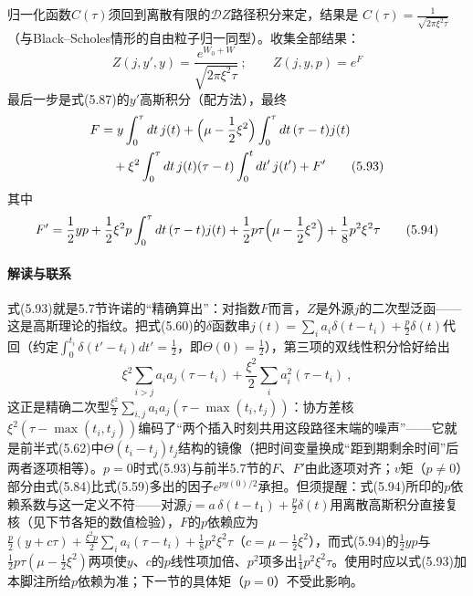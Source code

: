 归一化函数$C(\tau)$须回到离散有限的$\mathcal{D}Z$路径积分来定，结果是
$C(\tau)=\frac{1}{\sqrt{2\pi\xi^{2}\tau}}$（与Black--Scholes情形的自由粒子归一同型）。收集全部结果：
\begin{equation*}
Z(j,y',y)=\frac{e^{W_{0}+W}}{\sqrt{2\pi\xi^{2}\tau}}\ ;\qquad
Z(j,y,p)=e^{F}
\end{equation*}
最后一步是式(5.87)的$y'$高斯积分（配方法），最终
\begin{align*}
F&=y\int_{0}^{\tau}dt\,j(t)
+\Bigl(\mu-\frac{1}{2}\xi^{2}\Bigr)\int_{0}^{\tau}dt\,(\tau-t)j(t)\\
&\quad+\xi^{2}\int_{0}^{\tau}dt\,j(t)(\tau-t)\int_{0}^{t}dt'\,j(t')+F'
\tag{5.93}
\end{align*}
其中
\begin{equation*}
F'=\frac{1}{2}yp+\frac{1}{2}\xi^{2}p\int_{0}^{\tau}dt\,(\tau-t)j(t)
+\frac{1}{2}p\tau\Bigl(\mu-\frac{1}{2}\xi^{2}\Bigr)
+\frac{1}{8}p^{2}\xi^{2}\tau
\tag{5.94}
\end{equation*}

\paragraph{解读与联系}
式(5.93)就是5.7节许诺的“精确算出”：对指数$F$而言，$Z$是外源$j$的二次型泛函——这是高斯理论的指纹。把式(5.60)的$\delta$函数串$j(t)=\sum_ia_i\delta(t-t_i)+\frac{p}{2}\delta(t)$代回（约定$\int_0^{t_i}\delta(t'-t_i)dt'=\frac{1}{2}$，即$\Theta(0)=\frac{1}{2}$），第三项的双线性积分恰好给出
\begin{equation*}
\xi^{2}\sum_{i>j}a_ia_j(\tau-t_i)+\frac{\xi^{2}}{2}\sum_ia_i^{2}(\tau-t_i)\ ,
\end{equation*}
这正是精确二次型$\frac{\xi^{2}}{2}\sum_{i,j}a_ia_j(\tau-\max(t_i,t_j))$：协方差核$\xi^{2}(\tau-\max(t_i,t_j))$编码了“两个插入时刻共用这段路径末端的噪声”——它就是前半式(5.62)中$\Theta(t_i-t_j)t_j$结构的镜像（把时间变量换成“距到期剩余时间”后两者逐项相等）。$p=0$时式(5.93)与前半5.7节的$F$、$F'$由此逐项对齐；$v$矩（$p\neq0$）部分由式(5.84)比式(5.59)多出的因子$e^{py(0)/2}$承担。但须提醒：式(5.94)所印的$p$依赖系数与这一定义不符——对源$j=a\,\delta(t-t_1)+\frac{p}{2}\delta(t)$用离散高斯积分直接复核（见下节各矩的数值检验），$F$的$p$依赖应为$\frac{p}{2}(y+c\tau)+\frac{\xi^{2}p}{2}\sum_ia_i(\tau-t_i)+\frac{1}{8}p^{2}\xi^{2}\tau$（$c=\mu-\frac{1}{2}\xi^{2}$），而式(5.94)的$\frac{1}{2}yp$与$\frac{1}{2}p\tau(\mu-\frac{1}{2}\xi^{2})$两项使$y$、$c$的$p$线性项加倍、$p^{2}$项多出$\frac{1}{4}p^{2}\xi^{2}\tau$。使用时应以式(5.93)加本脚注所给$p$依赖为准；下一节的具体矩（$p=0$）不受此影响。

